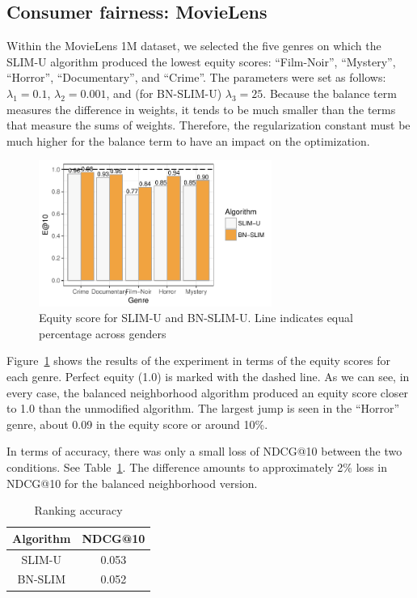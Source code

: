 \subsection{Consumer fairness: MovieLens}

Within the MovieLens 1M dataset, we selected the five genres on which the SLIM-U algorithm produced the lowest equity scores: ``Film-Noir'', ``Mystery'', ``Horror'', ``Documentary'', and ``Crime''. The parameters were set as follows: $\lambda_1 = 0.1$, $\lambda_2 = 0.001$, and (for BN-SLIM-U) $\lambda_3 = 25$. Because the balance term measures the difference in weights, it tends to be much smaller than the terms that measure the sums of weights. Therefore, the regularization constant must be much higher for the balance term to have an impact on the optimization. 

\begin{figure}[tbh]
    \centering
    \includegraphics[width=3.00in]{imgs/bln/genre-compare3.pdf}
    \caption{Equity score for SLIM-U and BN-SLIM-U. Line indicates equal percentage across genders}
    \label{fig:genre}
\end{figure}

Figure~\ref{fig:genre} shows the results of the experiment in terms of the equity scores for each genre. Perfect equity (1.0) is marked with the dashed line. As we can see, in every case, the balanced neighborhood algorithm produced an equity score closer to 1.0 than the unmodified algorithm. The largest jump is seen in the ``Horror'' genre, about 0.09 in the equity score or around 10\%.

In terms of accuracy, there was only a small loss of NDCG@10 between the two conditions. See Table~\ref{tab:ndcg}. The difference amounts to approximately 2\% loss in NDCG@10 for the balanced neighborhood version.

\begin{table}
\centering
\begin{tabular}{c|c}
    Algorithm &  NDCG@10 \\ \hline
    SLIM-U & 0.053 \\ \hline
    BN-SLIM & 0.052 \\ \hline
\end{tabular}
\caption{Ranking accuracy}
\label{tab:ndcg}
\end{table}


